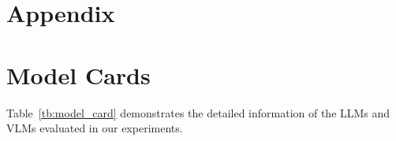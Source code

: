 \newpage
\appendix
\onecolumn

\section*{Appendix}


\section{Model Cards}
Table~\ref{tb:model_card} demonstrates the detailed information of the LLMs and VLMs evaluated in our experiments.

